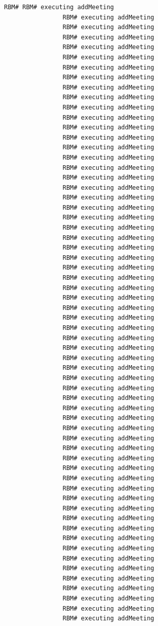\documentclass{article}
\begin{document}
\begin{Verbatim}[gobble=8]
                RBM# RBM# executing addMeeting
                RBM# executing addMeeting
                RBM# executing addMeeting
                RBM# executing addMeeting
                RBM# executing addMeeting
                RBM# executing addMeeting
                RBM# executing addMeeting
                RBM# executing addMeeting
                RBM# executing addMeeting
                RBM# executing addMeeting
                RBM# executing addMeeting
                RBM# executing addMeeting
                RBM# executing addMeeting
                RBM# executing addMeeting
                RBM# executing addMeeting
                RBM# executing addMeeting
                RBM# executing addMeeting
                RBM# executing addMeeting
                RBM# executing addMeeting
                RBM# executing addMeeting
                RBM# executing addMeeting
                RBM# executing addMeeting
                RBM# executing addMeeting
                RBM# executing addMeeting
                RBM# executing addMeeting
                RBM# executing addMeeting
                RBM# executing addMeeting
                RBM# executing addMeeting
                RBM# executing addMeeting
                RBM# executing addMeeting
                RBM# executing addMeeting
                RBM# executing addMeeting
                RBM# executing addMeeting
                RBM# executing addMeeting
                RBM# executing addMeeting
                RBM# executing addMeeting
                RBM# executing addMeeting
                RBM# executing addMeeting
                RBM# executing addMeeting
                RBM# executing addMeeting
                RBM# executing addMeeting
                RBM# executing addMeeting
                RBM# executing addMeeting
                RBM# executing addMeeting
                RBM# executing addMeeting
                RBM# executing addMeeting
                RBM# executing addMeeting
                RBM# executing addMeeting
                RBM# executing addMeeting
                RBM# executing addMeeting
                RBM# executing addMeeting
                RBM# executing addMeeting
                RBM# executing addMeeting
                RBM# executing addMeeting
                RBM# executing addMeeting
                RBM# executing addMeeting
                RBM# executing addMeeting
                RBM# executing addMeeting
                RBM# executing addMeeting
                RBM# executing addMeeting
                RBM# executing addMeeting
                RBM# executing addMeeting

\end{Verbatim}
\end{document}
